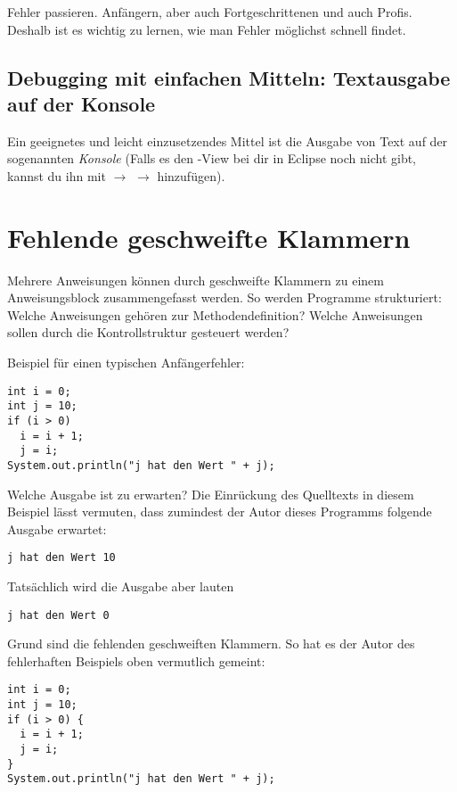 Fehler passieren. Anfängern, aber auch Fortgeschrittenen und auch Profis.
Deshalb ist es wichtig zu lernen, wie man Fehler möglichst schnell findet.

\subsection{Debugging mit einfachen Mitteln: Textausgabe auf der Konsole}

Ein geeignetes und leicht einzusetzendes Mittel ist die Ausgabe von Text auf der
sogenannten \emph{Konsole} (Falls es den -View bei dir in Eclipse
noch nicht gibt, kannst du ihn mit  $\rightarrow$  $\rightarrow$  hinzufügen).


\section{Fehlende geschweifte Klammern}

Mehrere Anweisungen können durch geschweifte Klammern zu einem Anweisungsblock
zusammengefasst werden. So werden Programme strukturiert: Welche Anweisungen
gehören zur Methodendefinition? Welche Anweisungen sollen durch die
Kontrollstruktur gesteuert werden?

Beispiel für einen typischen Anfängerfehler:

\begin{lstlisting}
int i = 0;
int j = 10;
if (i > 0)
  i = i + 1;
  j = i;
System.out.println("j hat den Wert " + j);
\end{lstlisting}

Welche Ausgabe ist zu erwarten? Die Einrückung des Quelltexts in diesem Beispiel
lässt vermuten, dass zumindest der Autor dieses Programms folgende Ausgabe
erwartet:

\begin{lstlisting}
j hat den Wert 10
\end{lstlisting}

Tatsächlich wird die Ausgabe aber lauten

\begin{lstlisting}
j hat den Wert 0
\end{lstlisting}

Grund sind die fehlenden geschweiften Klammern. So hat es der Autor des
fehlerhaften Beispiels oben vermutlich gemeint:

\begin{lstlisting}
int i = 0;
int j = 10;
if (i > 0) {
  i = i + 1;
  j = i;
}
System.out.println("j hat den Wert " + j);
\end{lstlisting}

